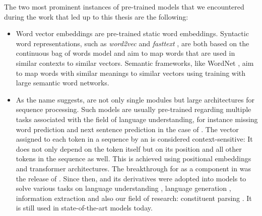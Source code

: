 \documentclass[../document.tex]{subfiles}
\begin{document}
    The two most prominent instances of pre-trained models that we encountered during the work that led up to this thesis are the following:
    \begin{itemize}
        \item
            Word vector embeddings are pre-trained static word embeddings.
            Syntactic word representations, such as \emph{word2vec} \citep{word2vec} and \emph{fasttext} \citep{fasttext}, are both based on the continuous bag of words model and aim to map words that are used in similar contexts to similar vectors.
            Semantic frameworks, like WordNet \citep{wordnet}, aim to map words with similar meanings to similar vectors using training with large semantic word networks.
        \item
            As the name suggests,   are not only single modules but large architectures for sequence processing.
            Such models are usually pre-trained regarding multiple tasks associated with the field of language understanding, for instance missing word prediction and next sentence prediction in the case of .
            The vector assigned to each token in a sequence by an  is considered context-sensitive:
                It does not only depend on the token itself but on its position and all other tokens in the sequence as well.
                This is achieved using positional embeddings and transformer architectures.
            The breakthrough for  as a component in  was the release of  \citep{Devlin2019}.
            Since then,  and its derivatives were adopted into models to solve various tasks on language understanding \citep[they experiment with models for question answering, entailment recognition, sentiment analysis, i.a.]{Devlin2019, roberta}, language generation \citep[they experiment with models for summarization, translation, i.a.]{bertgeneration}, information extraction \citep[they experiment with models for named entity recognition, relation extraction]{biobert} and also our field of research: constituent parsing \citep{Cor20, FerGom20a, FerGom22,Coa21, Sun22}.
            It is still used in state-of-the-art models today.
    \end{itemize}

    \ifSubfilesClassLoaded{%
        \printindex
    }{}
\end{document}
